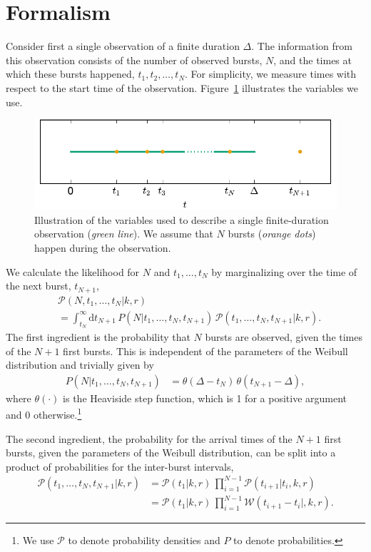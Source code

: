 \documentclass[fleqn,usenatbib]{mnras}
\newcommand{\new}[1]{#1}
\begin{document}
\section{Formalism}
\label{sec:formalism}

Consider first a single observation of a finite duration $\Delta$. The information from this observation consists of the number of observed bursts, $N$, and the times at which these bursts happened, $t_1, t_2,\dots, t_N$. For simplicity, we measure times with respect to the start time of the observation. Figure~\ref{fig:singleinterval} illustrates the variables we use.

\begin{figure}
	\includegraphics[width=\columnwidth]{singleinterval.pdf}
	\caption{\label{fig:singleinterval}Illustration of the variables used to describe a single finite-duration observation (\emph{green line}). We assume that $N$ bursts (\emph{orange dots}) happen during the observation.}
\end{figure}

We calculate the likelihood for $N$ and $t_1,\dots,t_N$ by marginalizing over the time of the next burst, $t_{N+1}$,
\begin{align}
	\label{eq:likelihood_firstsplit}
	&\mathcal{P}(N,t_1,\dots,t_N|k,r)\nonumber\\
	&= \int_{t_N}^\infty \mathrm{d}t_{N+1} \, P(N|t_1,\dots,t_N,t_{N+1}) \, \mathcal{P}(t_1,\dots,t_N,t_{N+1}|k,r).
\end{align}
The first ingredient is the probability that $N$ bursts are observed, given the times of the $N+1$ first bursts. This is independent of the parameters of the Weibull distribution and trivially given by
\begin{align}
	P(N|t_1,\dots,t_N,t_{N+1}) &= \theta(\Delta - t_N) \, \theta(t_{N+1} - \Delta),
\end{align}
where $\theta(\cdot)$ is the Heaviside step function, which is 1 for a positive argument and 0 otherwise.\footnote{We use $\mathcal{P}$ to denote probability densities and $P$ to denote probabilities.}

The second ingredient, the probability for \new{the arrival times of the $N+1$ first bursts}, given the parameters of the Weibull distribution, can be split into a product of probabilities for the inter-burst intervals,
\begin{align}
	\label{eq:likelihood_times}
	\mathcal{P}(t_1,\dots,t_N,t_{N+1}|k,r) & = \mathcal{P}(t_1|k,r) \, \prod_{i = 1}^{N - 1} \mathcal{P}(t_{i+1}|t_{i},k,r)\nonumber\\
	&= \mathcal{P}(t_1|k,r) \, \prod_{i = 1}^{N - 1} \mathcal{W}(t_{i+1} - t_i|,k,r).
\end{align}
\end{document}
